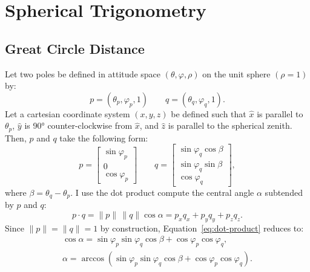 \chapter{Spherical Trigonometry}\label{app:spherical-trig}
\section{Great Circle Distance}
Let two poles be defined in attitude space $(\theta,\varphi,\rho)$ on the unit sphere $(\rho=1)$ by:
\begin{equation}
    p=(\theta_p,\varphi_p,1)\qquad q=(\theta_q,\varphi_q,1).
\end{equation}
Let a cartesian coordinate system $(x,y,z)$ be defined such that $\hat x$ is parallel to $\theta_p$, $\hat y$ is \ang{90} counter-clockwise from $\hat x$, and $\hat z$ is parallel to the spherical zenith. Then, $p$ and $q$ take the following form: %
\begin{equation}
    p=
    \begin{bmatrix}
        \sin\varphi_p\\
        0\\
        \cos\varphi_p
    \end{bmatrix}
    \qquad
    q=
    \begin{bmatrix}
        \sin\varphi_q\cos\beta\\
        \sin\varphi_q\sin\beta\\
        \cos\varphi_q
    \end{bmatrix},
\end{equation}
where $\beta=\theta_q-\theta_p$. I use the dot product compute the central angle $\alpha$ subtended by $p$ and $q$:
\begin{equation}
    p\cdot q
    =\|p\|\,\|q\|\cos\alpha
    =p_{x}q_{x}
    +p_{y}q_{y}
    +p_{z}q_{z}.\label{eq:dot-product}
\end{equation}
Since $\|p\|=\|q\|=1$ by construction, Equation~\eqref{eq:dot-product} reduces to:
\begin{gather}
    \cos\alpha
    =\sin\varphi_p\sin\varphi_q\cos\beta
    +\cos\varphi_p\cos\varphi_q,\nonumber\\
    \alpha
    =\arccos(\sin\varphi_p\sin\varphi_q\cos\beta
    +\cos\varphi_p\cos\varphi_q).
\end{gather}

